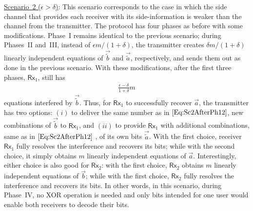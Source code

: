 \documentclass[journal,12pt,draftcls,onecolumn]{IEEEtran}
\newcommand{\msf}{\mathsf}
\begin{document}
\noindent \underline{Scenario~2 ($\epsilon > \delta$)}: This scenario corresponds to the case in which the side channel that provides each receiver with its side-information is weaker than the channel from the transmitter. The protocol has four phases as before with some modifications. Phase~I remains identical to the previous scenario; during Phases~II and~III, instead of $\epsilon m/(1+\delta)$, the transmitter creates $\delta m/(1+\delta)$ linearly independent equations of $\vec{\tilde{b}}$ and $\vec{\tilde{a}}$, respectively, and sends them out as done in the previous scenario. With these modifications, after the first three phases, $\msf{Rx}_1$, still has
\begin{align}
\label{Eq:Sc2AfterPh12}
\frac{\epsilon - \delta}{1+\delta}m
\end{align}
equations interfered by $\vec{\tilde{b}}$. Thus, for $\msf{Rx}_1$ to successfully recover $\vec{a}$, the transmitter has two options: $(i)$ to deliver the same number as in $\eqref{Eq:Sc2AfterPh12}$, new combinations of $\vec{\tilde{b}}$ to $\msf{Rx}_1$, and $(ii)$ to provide $\msf{Rx}_1$ with additional combinations, same as in $\eqref{Eq:Sc2AfterPh12}$ , of its own bits $\vec{\tilde{a}}$. With the first choice, receiver $\msf{Rx}_1$ fully resolves the interference and recovers its bits; while with the second choice, it simply obtains $m$ linearly independent equations of $\vec{a}$. Interestingly, either choice is also good for $\msf{Rx}_2$: with the first choice, $\msf{Rx}_2$ obtains $m$ linearly independent equations of $\vec{b}$; while with the first choice, $\msf{Rx}_2$ fully resolves the interference and recovers its bits. In other words, in this scenario, during Phase~IV, no XOR operation is needed and only bits intended for one user would enable both receivers to decode their bits.
\end{document}

